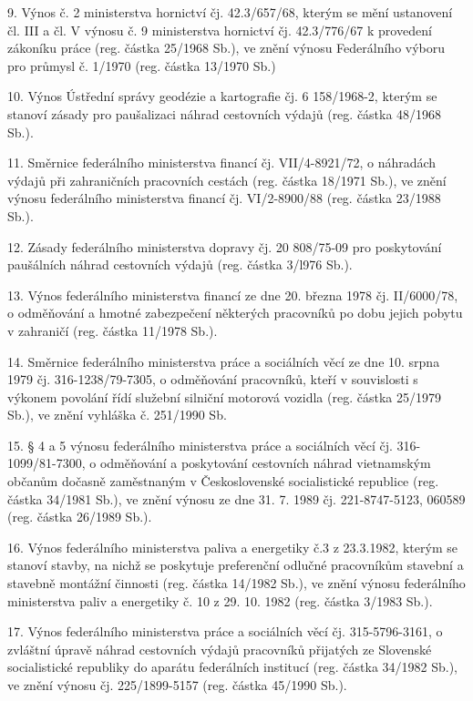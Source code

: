 \documentclass[11pt,a4paper]{article}
\begin{document}
9. Výnos č. 2 ministerstva hornictví čj. 42.3/657/68, kterým se mění ustanovení čl. III a čl. V výnosu č. 9 ministerstva hornictví čj. 42.3/776/67 k provedení zákoníku práce (reg. částka 25/1968 Sb.), ve znění výnosu Federálního výboru pro průmysl č. 1/1970 (reg. částka 13/1970 Sb.)

10. Výnos Ústřední správy geodézie a kartografie čj. 6 158/1968-2, kterým se stanoví zásady pro paušalizaci náhrad cestovních výdajů (reg. částka 48/1968 Sb.).

11. Směrnice federálního ministerstva financí čj. VII/4-8921/72, o náhradách výdajů při zahraničních pracovních cestách (reg. částka 18/1971 Sb.), ve znění výnosu federálního ministerstva financí čj. VI/2-8900/88 (reg. částka 23/1988 Sb.).

12. Zásady federálního ministerstva dopravy čj. 20 808/75-09 pro poskytování paušálních náhrad cestovních výdajů (reg. částka 3/l976 Sb.).

13. Výnos federálního ministerstva financí ze dne 20. března 1978 čj. II/6000/78, o odměňování a hmotné zabezpečení některých pracovníků po dobu jejich pobytu v zahraničí (reg. částka 11/1978 Sb.).

14. Směrnice federálního ministerstva práce a sociálních věcí ze dne 10. srpna 1979 čj. 316-1238/79-7305, o odměňování pracovníků, kteří v souvislosti s výkonem povolání řídí služební silniční motorová vozidla (reg. částka 25/1979 Sb.), ve znění vyhláška č. 251/1990 Sb.

15. § 4 a 5 výnosu federálního ministerstva práce a sociálních věcí čj. 316-1099/81-7300, o odměňování a poskytování cestovních náhrad vietnamským občanům dočasně zaměstnaným v Československé socialistické republice (reg. částka 34/1981 Sb.), ve znění výnosu ze dne 31. 7. 1989 čj. 221-8747-5123, 060589 (reg. částka 26/1989 Sb.).

16. Výnos federálního ministerstva paliva a energetiky č.3 z 23.3.1982, kterým se stanoví stavby, na nichž se poskytuje preferenční odlučné pracovníkům stavební a stavebně montážní činnosti (reg. částka 14/1982 Sb.), ve znění výnosu federálního ministerstva paliv a energetiky č. 10 z 29. 10. 1982 (reg. částka 3/1983 Sb.).

17. Výnos federálního ministerstva práce a sociálních věcí čj. 315-5796-3161, o zvláštní úpravě náhrad cestovních výdajů pracovníků přijatých ze Slovenské socialistické republiky do aparátu federálních institucí (reg. částka 34/1982 Sb.), ve znění výnosu čj. 225/1899-5157 (reg. částka 45/1990 Sb.).
\end{document}
